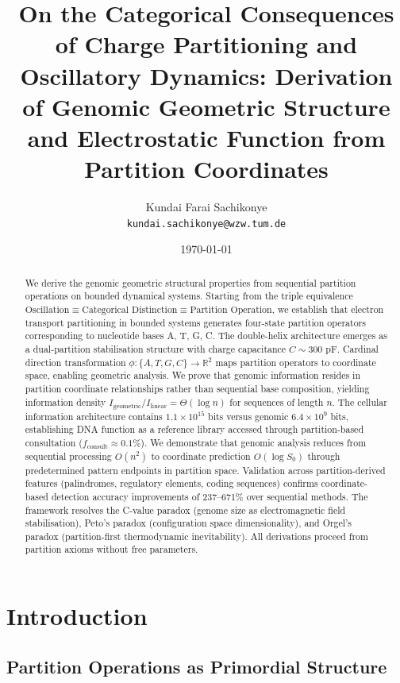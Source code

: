\documentclass[11pt,a4paper]{article}
\title{\textbf{On the Categorical Consequences of Charge Partitioning and Oscillatory Dynamics: Derivation of Genomic Geometric Structure and Electrostatic Function from Partition Coordinates}}
\author{
    Kundai Farai Sachikonye\\
    \texttt{kundai.sachikonye@wzw.tum.de}
}
\date{\today}
\theoremstyle{remark}
\begin{document}
\maketitle

\begin{abstract}
We derive the genomic geometric structural properties from sequential partition operations on bounded dynamical systems. Starting from the triple equivalence $\text{Oscillation} \equiv \text{Categorical Distinction} \equiv \text{Partition Operation}$, we establish that electron transport partitioning in bounded systems generates four-state partition operators corresponding to nucleotide bases A, T, G, C. The double-helix architecture emerges as a dual-partition stabilisation structure with charge capacitance $C \sim 300$ pF. Cardinal direction transformation $\phi: \{A,T,G,C\} \to \mathbb{R}^2$ maps partition operators to coordinate space, enabling geometric analysis. We prove that genomic information resides in partition coordinate relationships rather than sequential base composition, yielding information density $I_{\text{geometric}}/I_{\text{linear}} = \Theta(\log n)$ for sequences of length $n$. The cellular information architecture contains $1.1 \times 10^{15}$ bits versus genomic $6.4 \times 10^9$ bits, establishing DNA function as a reference library accessed through partition-based consultation ($f_{\text{consult}} \approx 0.1\%$). We demonstrate that genomic analysis reduces from sequential processing $O(n^2)$ to coordinate prediction $O(\log S_0)$ through predetermined pattern endpoints in partition space. Validation across partition-derived features (palindromes, regulatory elements, coding sequences) confirms coordinate-based detection accuracy improvements of 237–671\% over sequential methods. The framework resolves the C-value paradox (genome size as electromagnetic field stabilisation), Peto's paradox (configuration space dimensionality), and Orgel's paradox (partition-first thermodynamic inevitability). All derivations proceed from partition axioms without free parameters.
\end{abstract}

\tableofcontents
\newpage

\section{Introduction}

\subsection{Partition Operations as Primordial Structure}
\end{document}

